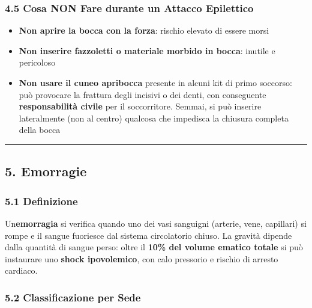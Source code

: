 \documentclass[a4paper,11pt]{article}
\providecommand{\tightlist}{%
  \setlength{\itemsep}{0pt}\setlength{\parskip}{0pt}}
\begin{document}
\subsubsection{4.5 Cosa NON Fare durante un Attacco
      Epilettico}\label{cosa-non-fare-durante-un-attacco-epilettico}

\begin{itemize}
      \tightlist
      \item
            \textbf{Non aprire la bocca con la forza}: rischio elevato di essere
            morsi
      \item
            \textbf{Non inserire fazzoletti o materiale morbido in bocca}: inutile
            e pericoloso
      \item
            \textbf{Non usare il cuneo apribocca} presente in alcuni kit di primo
            soccorso: può provocare la frattura degli incisivi o dei denti, con
            conseguente \textbf{responsabilità civile} per il soccorritore.
            Semmai, si può inserire lateralmente (non al centro) qualcosa che
            impedisca la chiusura completa della bocca
\end{itemize}

\begin{center}\rule{0.5\linewidth}{0.5pt}\end{center}

\subsection{5. Emorragie}\label{emorragie}

\subsubsection{5.1 Definizione}\label{definizione}

Un\textquotesingle{}\textbf{emorragia} si verifica quando uno dei vasi
sanguigni (arterie, vene, capillari) si rompe e il sangue fuoriesce dal
sistema circolatorio chiuso. La gravità dipende dalla quantità di sangue
perso: oltre il \textbf{10\% del volume ematico totale} si può
instaurare uno \textbf{shock ipovolemico}, con calo pressorio e rischio
di arresto cardiaco.

\subsubsection{5.2 Classificazione per
      Sede}\label{classificazione-per-sede}
\end{document}

